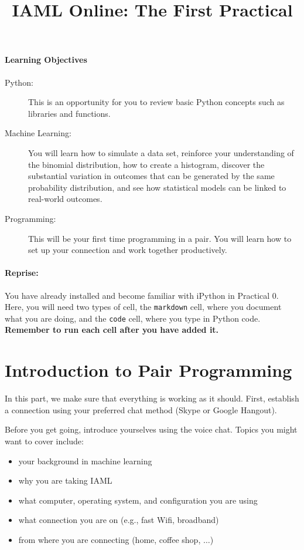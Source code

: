 \documentclass{article}
\begin{document}
\title{IAML Online: The First Practical}

\maketitle

\paragraph{Learning Objectives}


\begin{description}
	\item[Python:] This is an opportunity for you to review basic Python concepts such as libraries and functions.
	\item[Machine Learning:] You will learn how to simulate a data set, reinforce your understanding of the binomial distribution, how to create a histogram, discover the substantial variation in outcomes that can be generated by the same probability distribution, and see how statistical models can be linked to real-world outcomes. 
	\item[Programming:] This will be your first time programming in a pair. You will learn how to set up your connection and work together productively.
\end{description}
	  

\paragraph{Reprise:} You have already installed and become familiar with iPython in Practical 0. Here, you will need two types of cell, the \texttt{markdown} cell, where you document what you are doing, and the \texttt{code} cell, where you type in Python code. \textbf{Remember to run each cell after you have added it.}

\section{Introduction to Pair Programming}

In this part, we make sure that everything is working as it should. First, establish a connection using your preferred chat method (Skype or Google Hangout).

Before you get going, introduce yourselves using the voice chat. Topics you might want to cover include:
\begin{itemize}
	\item your background in machine learning
	\item why you are taking IAML
	\item what computer, operating system, and configuration you are using
	\item what connection you are on (e.g., fast Wifi, broadband)
	\item from where you are connecting (home, coffee shop, $\ldots$)
\end{itemize}
\end{document}
